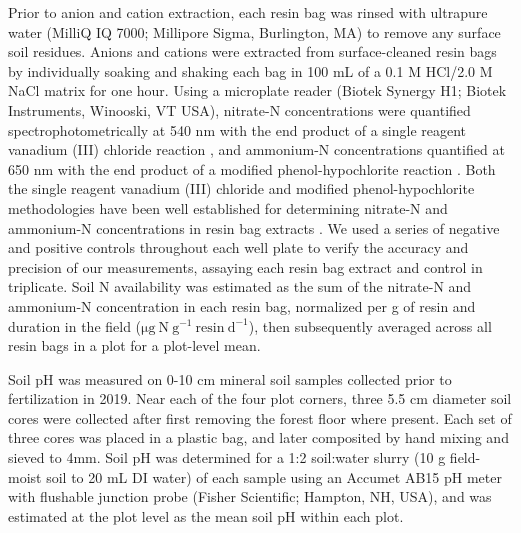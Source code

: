 Prior to anion and cation extraction, each resin bag was rinsed with ultrapure water (MilliQ IQ 7000; Millipore Sigma, Burlington, MA) to remove any surface soil residues. Anions and cations were extracted from surface-cleaned resin bags by individually soaking and shaking each bag in 100 mL of a 0.1 M HCl/2.0 M NaCl matrix for one hour. Using a microplate reader (Biotek Synergy H1; Biotek Instruments, Winooski, VT USA), nitrate-N concentrations were quantified spectrophotometrically at 540 nm with the end product of a single reagent vanadium (III) chloride reaction , and ammonium-N concentrations quantified at 650 nm with the end product of a modified phenol-hypochlorite reaction . Both the single reagent vanadium (III) chloride and modified phenol-hypochlorite methodologies have been well established for determining nitrate-N and ammonium-N concentrations in resin bag extracts . We used a series of negative and positive controls throughout each well plate to verify the accuracy and precision of our measurements, assaying each resin bag extract and control in triplicate. Soil N availability was estimated as the sum of the nitrate-N and ammonium-N concentration in each resin bag, normalized per g of resin and duration in the field ($\mathrm{\mu g\ N\ g^{-1}\ resin\ d^{-1}}$), then subsequently averaged across all resin bags in a plot for a plot-level mean.
    
Soil pH was measured on 0-10 cm mineral soil samples collected prior to fertilization in 2019. Near each of the four plot corners, three 5.5 cm diameter soil cores were collected after first removing the forest floor where present. Each set of three cores was placed in a plastic bag, and later composited by hand mixing and sieved to 4mm. Soil pH was determined for a 1:2 soil:water slurry (10 g field-moist soil to 20 mL DI water) of each sample using an Accumet AB15 pH meter with flushable junction probe (Fisher Scientific; Hampton, NH, USA), and was estimated at the plot level as the mean soil pH within each plot.

